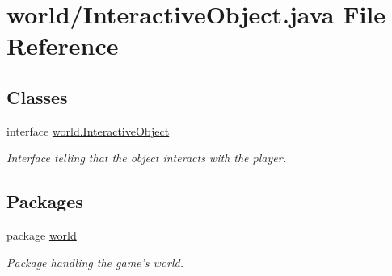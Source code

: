 \hypertarget{a00061}{\section{world/\-Interactive\-Object.java File Reference}
\label{a00061}
}
\subsection*{Classes}
\begin{DoxyCompactItemize}
\item 
interface \hyperlink{a00014}{world.\-Interactive\-Object}
\begin{DoxyCompactList}\small\item\em Interface telling that the object interacts with the player. \end{DoxyCompactList}\end{DoxyCompactItemize}
\subsection*{Packages}
\begin{DoxyCompactItemize}
\item 
package \hyperlink{a00089}{world}
\begin{DoxyCompactList}\small\item\em Package handling the game's world. \end{DoxyCompactList}\end{DoxyCompactItemize}
